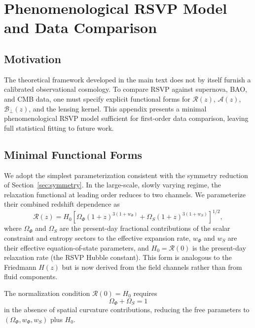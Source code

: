 \documentclass[12pt,a4paper]{article}
\theoremstyle{remark}
\newcommand{\Rcal}{\mathcal{R}}
\newcommand{\Acal}{\mathcal{A}}
\newcommand{\Bcal}{\mathcal{B}}
\begin{document}
\section{Phenomenological RSVP Model and Data Comparison}
\label{app:pheno}

\subsection{Motivation}

The theoretical framework developed in the main text does not by itself furnish
a calibrated observational cosmology. To compare RSVP against supernova,
BAO, and CMB data, one must specify explicit functional forms for
$\Rcal(z)$, $\Acal(z)$, $\Bcal_\perp(z)$, and the lensing kernel. This
appendix presents a minimal phenomenological RSVP model sufficient for
first-order data comparison, leaving full statistical fitting to future work.

\subsection{Minimal Functional Forms}

We adopt the simplest parameterization consistent with the symmetry reduction
of Section~\ref{sec:symmetry}. In the large-scale, slowly varying regime, the
relaxation functional at leading order reduces to two channels. We parameterize
their combined redshift dependence as
\begin{equation}
\Rcal(z) = H_0\left[
  \Omega_\Phi (1+z)^{3(1+w_\Phi)}
  + \Omega_S (1+z)^{3(1+w_S)}
\right]^{1/2},
\label{eq:R_pheno}
\end{equation}
where $\Omega_\Phi$ and $\Omega_S$ are the present-day fractional contributions
of the scalar constraint and entropy sectors to the effective expansion rate,
$w_\Phi$ and $w_S$ are their effective equation-of-state parameters, and
$H_0 = \Rcal(0)$ is the present-day relaxation rate (the RSVP Hubble constant).
This form is analogous to the Friedmann $H(z)$ but is now derived from the
field channels rather than from fluid components.

The normalization condition $\Rcal(0) = H_0$ requires
\begin{equation}
\Omega_\Phi + \Omega_S = 1
\end{equation}
in the absence of spatial curvature contributions, reducing the free parameters
to $(\Omega_\Phi, w_\Phi, w_S)$ plus $H_0$.
\end{document}
